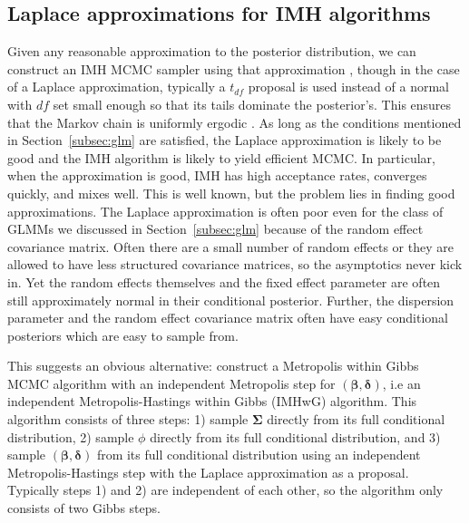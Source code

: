 \documentclass[12pt]{article}
\begin{document}
\subsection{Laplace approximations for IMH algorithms}\label{subsec:laplaceimh}
Given any reasonable approximation to the posterior distribution, we can construct an IMH MCMC sampler using that approximation \citep[Chapter~7.4]{robert2013monte}, though in the case of a Laplace approximation, typically a $t_{df}$ proposal is used instead of a normal with $df$ set small enough so that its tails dominate the posterior's. This ensures that the Markov chain is uniformly ergodic \citep[Theorem~7.8]{robert2013monte}. As long as the conditions mentioned in Section~\ref{subsec:glm} are satisfied, the Laplace approximation is likely to be good and the IMH algorithm is likely to yield efficient MCMC. In particular, when the approximation is good, IMH has high acceptance rates, converges quickly, and mixes well. This is well known, but the problem lies in finding good approximations. The Laplace approximation is often poor even for the class of GLMMs we discussed in Section~\ref{subsec:glm} because of the random effect covariance matrix. Often there are a small number of random effects or they are allowed to have less structured covariance matrices, so the asymptotics never kick in. Yet the random effects themselves and the fixed effect parameter are often still approximately normal in their conditional posterior. Further, the dispersion parameter and the random effect covariance matrix often have easy conditional posteriors which are easy to sample from.

This suggests an obvious alternative: construct a Metropolis within Gibbs MCMC algorithm \citep[Chapter~10.3]{robert2013monte} with an independent Metropolis step for $(\bm{\beta}, \bm{\delta})$, i.e an independent Metropolis-Hastings within Gibbs (IMHwG) algorithm. This algorithm consists of three steps: 1) sample $\bm{\Sigma}$ directly from its full conditional distribution, 2) sample $\phi$ directly from its full conditional distribution, and 3) sample $(\bm{\beta}, \bm{\delta})$ from its full conditional distribution using an independent Metropolis-Hastings step with the Laplace approximation as a proposal. Typically steps 1) and 2) are independent of each other, so the algorithm only consists of two Gibbs steps.
\end{document}
